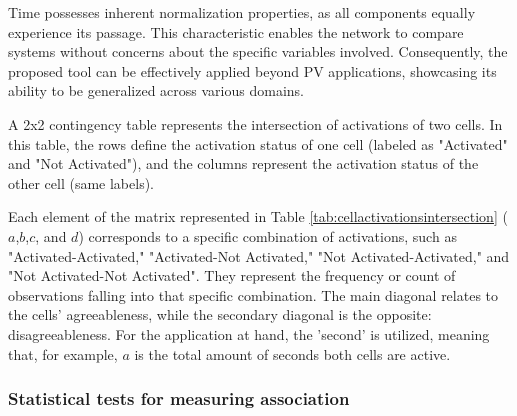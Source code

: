 Time possesses inherent normalization properties, as all components equally experience its passage. This characteristic enables the network to compare systems without concerns about the specific variables involved. Consequently, the proposed tool can be effectively applied beyond PV applications, showcasing its ability to be generalized across various domains.

A 2x2 contingency table represents the intersection of activations of two cells. In this table, the rows define the activation status of one cell (labeled as "Activated" and "Not Activated"), and the columns represent the activation status of the other cell (same labels).

\begin{table}[h!]
    \centering
    \caption{Contigency table representing the activation intersection of two cells.}
    \label{tab:cellactivationsintersection}
\end{table}

Each element of the matrix represented in Table \ref{tab:cellactivationsintersection} ($a$,$b$,$c$, and $d$) corresponds to a specific combination of activations, such as "Activated-Activated," "Activated-Not Activated," "Not Activated-Activated," and "Not Activated-Not Activated". They represent the frequency or count of observations falling into that specific combination. The main diagonal relates to the cells' agreeableness, while the secondary diagonal is the opposite: disagreeableness. For the application at hand, the 'second' is utilized, meaning that, for example, $a$ is the total amount of seconds both cells are active.

\subsubsection{Statistical tests for measuring association}


